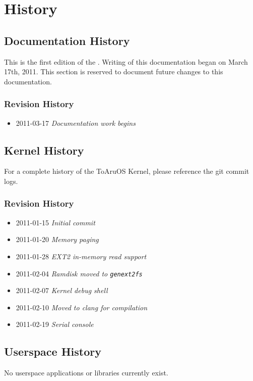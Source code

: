 \section{History}

\subsection{Documentation History}
This is the first edition of the \toarutitle. Writing of this documentation began on March 17th, 2011. This section is reserved to document future changes to this documentation.

\subsubsection{Revision History}
\begin{itemize}
    \item 2011-03-17 \emph{Documentation work begins}
\end{itemize}

\subsection{Kernel History}
For a complete history of the ToAruOS Kernel, please reference the git commit logs.

\subsubsection{Revision History}
\begin{itemize}
    \item 2011-01-15 \emph{Initial commit}
    \item 2011-01-20 \emph{Memory paging}
    \item 2011-01-28 \emph{EXT2 in-memory read support}
    \item 2011-02-04 \emph{Ramdisk moved to \texttt{genext2fs}}
    \item 2011-02-07 \emph{Kernel debug shell}
    \item 2011-02-10 \emph{Moved to clang for compilation}
    \item 2011-02-19 \emph{Serial console}
\end{itemize}

\subsection{Userspace History}
No userspace applications or libraries currently exist.
